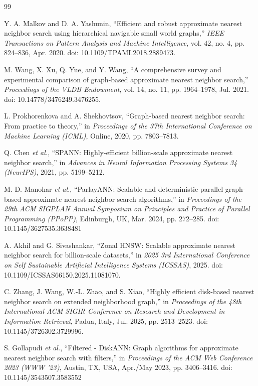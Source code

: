 \documentclass[conference]{IEEEtran}
\begin{document}
\begin{thebibliography}{99}

Y. A. Malkov and D. A. Yashunin, “Efficient and robust approximate nearest neighbor search using hierarchical navigable small world graphs,” \emph{IEEE Transactions on Pattern Analysis and Machine Intelligence}, vol. 42, no. 4, pp. 824–836, Apr. 2020. doi: 10.1109/TPAMI.2018.2889473.

M. Wang, X. Xu, Q. Yue, and Y. Wang, “A comprehensive survey and experimental comparison of graph-based approximate nearest neighbor search,” \emph{Proceedings of the VLDB Endowment}, vol. 14, no. 11, pp. 1964–1978, Jul. 2021. doi: 10.14778/3476249.3476255.

L. Prokhorenkova and A. Shekhovtsov, “Graph-based nearest neighbor search: From practice to theory,” in \emph{Proceedings of the 37th International Conference on Machine Learning (ICML)}, Online, 2020, pp. 7803–7813.

Q. Chen \emph{et al.}, “SPANN: Highly-efficient billion-scale approximate nearest neighbor search,” in \emph{Advances in Neural Information Processing Systems 34 (NeurIPS)}, 2021, pp. 5199–5212.

M. D. Manohar \emph{et al.}, “ParlayANN: Scalable and deterministic parallel graph-based approximate nearest neighbor search algorithms,” in \emph{Proceedings of the 29th ACM SIGPLAN Annual Symposium on Principles and Practice of Parallel Programming (PPoPP)}, Edinburgh, UK, Mar. 2024, pp. 272–285. doi: 10.1145/3627535.3638481

A. Akhil and G. Sivashankar, “Zonal HNSW: Scalable approximate nearest neighbor search for billion-scale datasets,” in \emph{2025 3rd International Conference on Self Sustainable Artificial Intelligence Systems (ICSSAS)}, 2025. doi: 10.1109/ICSSAS66150.2025.11081070.

C. Zhang, J. Wang, W.-L. Zhao, and S. Xiao, “Highly efficient disk-based nearest neighbor search on extended neighborhood graph,” in \emph{Proceedings of the 48th International ACM SIGIR Conference on Research and Development in Information Retrieval}, Padua, Italy, Jul. 2025, pp. 2513–2523. doi: 10.1145/3726302.3729996.

S. Gollapudi \emph{et al.}, “Filtered - DiskANN: Graph algorithms for approximate nearest neighbor search with filters,” in \emph{Proceedings of the ACM Web Conference 2023 (WWW '23)}, Austin, TX, USA, Apr./May 2023, pp. 3406–3416. doi: 10.1145/3543507.3583552


\end{thebibliography}
\end{document}
